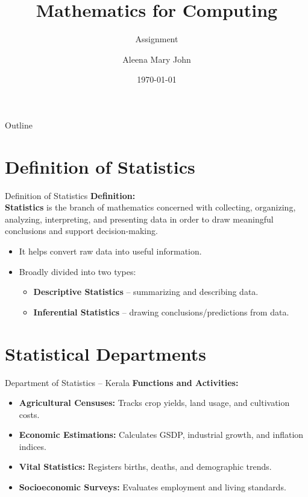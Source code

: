 \documentclass{beamer}
\title{Mathematics for Computing}
\subtitle{Assignment}
\author{Aleena Mary John}
\institute{Cochin University of Science and Technology (CUSAT)}
\date{\today}
\begin{document}
\frame{\titlepage}

\begin{frame}{Outline}
\tableofcontents
\end{frame}

\section{Definition of Statistics}
\begin{frame}{Definition of Statistics}
\textbf{Definition:}\\[0.5mm]
\textbf{Statistics} is the branch of mathematics concerned with collecting, organizing, analyzing, interpreting, and presenting data in order to draw meaningful conclusions and support decision-making.
\vspace{1.5mm}
\begin{itemize}
    \item It helps convert raw data into useful information.
    \item Broadly divided into two types:
    \begin{itemize}
        \item \textbf{Descriptive Statistics} -- summarizing and describing data.
        \item \textbf{Inferential Statistics} -- drawing conclusions/predictions from data.
    \end{itemize}
\end{itemize}
\end{frame}

\section{Statistical Departments}

\begin{frame}{Department of Statistics -- Kerala}
\textbf{Functions and Activities:}
\begin{itemize}
    \item \textbf{Agricultural Censuses:} Tracks crop yields, land usage, and cultivation costs.
    \item \textbf{Economic Estimations:} Calculates GSDP, industrial growth, and inflation indices.
    \item \textbf{Vital Statistics:} Registers births, deaths, and demographic trends.
    \item \textbf{Socioeconomic Surveys:} Evaluates employment and living standards.
\end{itemize}
\end{frame}
\end{document}
